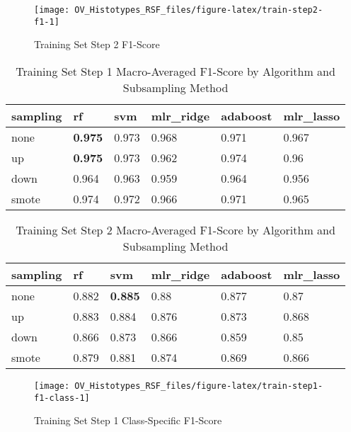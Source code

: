 \documentclass[
]{report}
\begin{document}
\begin{figure}[H]

{\centering \texttt{[image: OV\_Histotypes\_RSF\_files/figure-latex/train-step2-f1-1]} 

}

\caption{Training Set Step 2 F1-Score}\label{fig:train-step2-f1}
\end{figure}

\begin{table}

\caption{\label{tab:train-step1-f1-table}Training Set Step 1 Macro-Averaged F1-Score by Algorithm and Subsampling Method}
\centering
\begin{tabular}[t]{l|l|l|l|l|l}
\hline
sampling & rf & svm & mlr\_ridge & adaboost & mlr\_lasso\\
\hline
none & \textbf{0.975} & 0.973 & 0.968 & 0.971 & 0.967\\
\hline
up & \textbf{0.975} & 0.973 & 0.962 & 0.974 & 0.96\\
\hline
down & 0.964 & 0.963 & 0.959 & 0.964 & 0.956\\
\hline
smote & 0.974 & 0.972 & 0.966 & 0.971 & 0.965\\
\hline
\end{tabular}
\end{table}

\begin{table}

\caption{\label{tab:train-step2-f1-table}Training Set Step 2 Macro-Averaged F1-Score by Algorithm and Subsampling Method}
\centering
\begin{tabular}[t]{l|l|l|l|l|l}
\hline
sampling & rf & svm & mlr\_ridge & adaboost & mlr\_lasso\\
\hline
none & 0.882 & \textbf{0.885} & 0.88 & 0.877 & 0.87\\
\hline
up & 0.883 & 0.884 & 0.876 & 0.873 & 0.868\\
\hline
down & 0.866 & 0.873 & 0.866 & 0.859 & 0.85\\
\hline
smote & 0.879 & 0.881 & 0.874 & 0.869 & 0.866\\
\hline
\end{tabular}
\end{table}

\begin{figure}[H]

{\centering \texttt{[image: OV\_Histotypes\_RSF\_files/figure-latex/train-step1-f1-class-1]} 

}

\caption{Training Set Step 1 Class-Specific F1-Score}\label{fig:train-step1-f1-class}
\end{figure}
\end{document}
